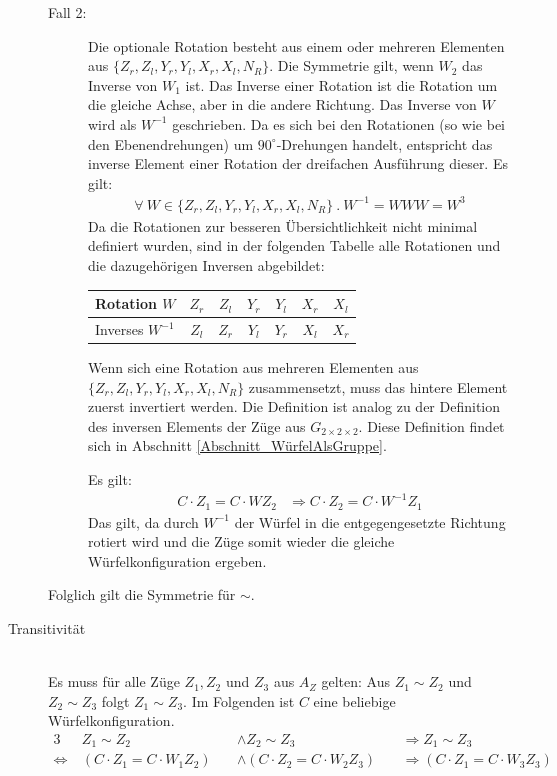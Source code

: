 \documentclass[12pt,a4paper, usenames, dvipsnames]{article}
\theoremstyle{mystyle}
\theoremstyle{definition}
\newcommand{\Gtwo}{\ensuremath{G_{2\times 2\times 2}}}
\begin{document}
\begin{description}
\begin{description}
\item[Fall 2:]
Die optionale Rotation besteht aus einem oder mehreren Elementen aus $\{{Z_r}, {Z_l}, {Y_r}, {Y_l}, {X_r}, {X_l}, N_R\}$.
Die Symmetrie gilt, wenn $W_2$ das Inverse von $W_1$ ist. Das Inverse einer Rotation ist die Rotation um die gleiche Achse, aber in die andere Richtung. 
Das Inverse von $W$ wird als $W^{-1}$ geschrieben. 
Da es sich bei den Rotationen (so wie bei den Ebenendrehungen) um $90^\circ$-Drehungen handelt, entspricht das inverse Element einer Rotation der dreifachen Ausführung dieser. 
Es gilt:
\begin{align*}
\forall  \ W \in \{{Z_r}, {Z_l}, {Y_r}, {Y_l}, {X_r}, {X_l}, N_R\} \ . \ W^{-1} = WWW = W^3
\end{align*}
Da die Rotationen zur besseren Übersichtlichkeit nicht minimal definiert wurden, sind in der folgenden Tabelle alle Rotationen und die dazugehörigen Inversen abgebildet:

\begin{center}
\begin{tabular}{lcccccc}
Rotation $W$ & ${Z_r}$ & ${Z_l}$ &  ${Y_r}$ & ${Y_l}$ & ${X_r}$ & ${X_l}$  \\
\hline
Inverses \hspace*{0.1em} $W^{-1}$ & ${Z_l}$ & ${Z_r}$ &  ${Y_l}$ & ${Y_r}$ & ${X_l}$ & ${X_r}$  \\
\end{tabular} 
\end{center}


Wenn sich eine Rotation aus mehreren Elementen aus $\{{Z_r}, {Z_l}, {Y_r}, {Y_l}, {X_r}, {X_l}, N_R\}$ zusammensetzt, muss das hintere Element zuerst invertiert werden. Die Definition ist analog zu der Definition des inversen Elements der Züge aus $\Gtwo.$ Diese Definition findet sich in Abschnitt \ref{Abschnitt_WürfelAlsGruppe}.
 
Es gilt: 
\begin{align*}
C \cdot  Z_1 = C \cdot  W Z_2 & \Rightarrow C \cdot  Z_2 = C \cdot  W^{-1} Z_1
\end{align*}
Das gilt, da durch $W^{-1}$ der Würfel in die entgegengesetzte Richtung rotiert wird und die Züge somit wieder die gleiche Würfelkonfiguration ergeben.

\end{description}

Folglich gilt die Symmetrie für $\sim$.


\item [Transitivität] \ \\
Es muss für alle Züge $Z_1, Z_2$ und $Z_3$ aus $A_Z$ gelten: Aus $Z_1 \sim Z_2$ und $Z_2 \sim Z_3$ folgt $Z_1 \sim Z_3$. Im Folgenden ist $C$ eine beliebige Würfelkonfiguration.
\begin{alignat*}{3}
& Z_1 \sim Z_2 && \wedge Z_2 \sim Z_3 && \Rightarrow Z_1 \sim Z_3 \\
\Leftrightarrow \ & (C \cdot  Z_1 = C \cdot  W_1Z_2) \ && \wedge (C \cdot  Z_2 = C \cdot  W_2Z_3) \ && \Rightarrow (C \cdot  Z_1 = C \cdot  W_3Z_3)
\end{alignat*}


\end{description}
\end{document}
